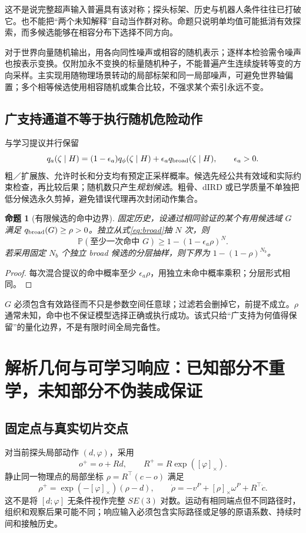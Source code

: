 \documentclass[UTF8,fontset=fandol,11pt,a4paper]{ctexart}
\theoremstyle{plain}
\newtheorem{proposition}[theorem]{命题}
\theoremstyle{definition}
\theoremstyle{remark}
\numberwithin{equation}{section}
\newcommand{\Prob}{\mathbb P}
\begin{document}
这不是说完整超声输入普遍具有该对称；探头标架、历史与机器人条件往往已打破它。也不能把“两个未知解释”自动当作群对称。命题只说明单均值可能抵消有效探索，而多候选能够在相容分布下选择不同方向。

对于世界向量随机输出，用各向同性噪声或相容的随机表示；逐样本检验需令噪声也按表示变换。仅附加永不变换的标量随机种子，不能普遍产生连续旋转等变的方向采样。主实现用随物理场景转动的局部标架和同一局部噪声，可避免世界轴偏置；多个相等候选使用相容随机或集合比较，不强求某个索引永远不变。

\subsection{广支持通道不等于执行随机危险动作}
与学习提议并行保留
\begin{equation}
q_a(\zeta\mid H)=(1-\epsilon_a)q_\phi(\zeta\mid H)
+\epsilon_aq_{\rm broad}(\zeta\mid H),\qquad \epsilon_a>0.
\label{eq:broad}
\end{equation}
粗／扩展族、允许时长和分支均有预定正采样概率。候选先经公共有效域和实际约束检查，再比较后果；随机数只产生\emph{规划候选}。粗骨、dIRD 或已学质量不单独把低分候选永久剪掉，避免错误代理再次封闭动作集合。

\begin{proposition}[有限候选的命中边界]
固定历史，设通过相同验证的某个有用候选域 $G$ 满足 $q_{\rm broad}(G)\ge\rho>0$。独立从式\eqref{eq:broad}抽 $N$ 次，则
\begin{equation}
\Prob(\text{至少一次命中 }G)\ge1-(1-\epsilon_a\rho)^N.
\label{eq:hitprob}
\end{equation}
若采用固定 $N_b$ 个独立 broad 候选的分层抽样，则下界为 $1-(1-\rho)^{N_b}$。
\end{proposition}
\begin{proof}
每次混合提议的命中概率至少 $\epsilon_a\rho$，用独立未命中概率乘积；分层形式相同。
\end{proof}

$G$ 必须包含有效路径而不只是参数空间任意球；过滤若会删掉它，前提不成立。$\rho$ 通常未知，命中也不保证模型选择正确或执行成功。该式只给“广支持为何值得保留”的量化边界，不是有限时间全局完备性。

\section{解析几何与可学习响应：已知部分不重学，未知部分不伪装成保证}
\label{sec:response}
\subsection{固定点与真实切片交点}
对当前探头局部动作 $(d,\varphi)$，采用
\begin{equation}
o^+=o+Rd,\qquad R^+=R\exp([\varphi]_\times).
\end{equation}
静止同一物理点的局部坐标 $\rho=R^\top(c-o)$ 满足
\begin{equation}
\rho^+=\exp(-[\varphi]_\times)(\rho-d),\qquad
\dot\rho=-v^P+[\rho]_\times\omega^P+R^\top\dot c.
\label{eq:kinematic}
\end{equation}
这不是将 $[d;\varphi]$ 无条件视作完整 $SE(3)$ 对数。运动有相同端点但不同路径时，组织和观察后果可能不同；响应输入必须包含实际路径或足够的原语系数、持续时间和接触历史。
\end{document}
